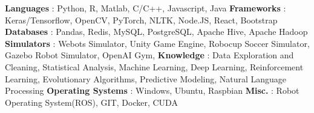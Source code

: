 \begin{cventries}  
\skillentry
    {
    \space \textbf{Languages} : Python, R, Matlab, C/C++, Javascript, Java
    \space \textbf{Frameworks} : Keras/Tensorflow, OpenCV, PyTorch, NLTK, Node.JS, React, Bootstrap
    \space \textbf{Databases} : Pandas, Redis, MySQL, PostgreSQL, Apache Hive, Apache Hadoop
    \space \textbf{Simulators} : Webots Simulator, Unity Game Engine, Robocup Soccer Simulator, Gazebo Robot Simulator, OpenAI Gym,
    \space \textbf{Knowledge} : Data Exploration and Cleaning, Statistical Analysis, Machine Learning, Deep Learning, Reinforcement Learning, Evolutionary Algorithms, Predictive Modeling, Natural Language Processing
    \space \textbf{Operating Systems} : Windows, Ubuntu, Raspbian 
    \space \textbf{Misc.} : Robot Operating System(ROS), GIT, Docker, CUDA
    }
    

\end{cventries}
\vspace{0.5 cm}